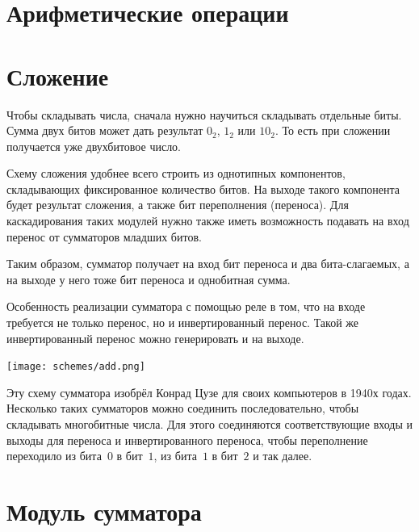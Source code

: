 \section{Арифметические операции}

\section{Сложение}

Чтобы складывать числа, сначала нужно научиться складывать отдельные биты.
Сумма двух битов может дать результат $0_2$, $1_2$ или $10_2$.
То есть при сложении получается уже двухбитовое число.

Схему сложения удобнее всего строить из однотипных компонентов, складывающих
фиксированное количество битов. На выходе такого компонента будет результат
сложения, а также бит переполнения (переноса). Для каскадирования
таких модулей нужно также иметь возможность подавать на вход перенос от
сумматоров младших битов.

Таким образом, сумматор получает на вход бит переноса и два бита-слагаемых, а на выходе
у него тоже бит переноса и однобитная сумма.

Особенность реализации сумматора с помощью реле в том, что на входе
требуется не только перенос, но и инвертированный перенос.
Такой же инвертированный перенос можно генерировать и на выходе.

\begin{center}
\texttt{[image: schemes/add.png]}
\end{center}

Эту схему сумматора изобрёл Конрад Цузе для своих компьютеров в 1940х годах.
Несколько таких сумматоров можно соединить последовательно, чтобы
складывать многобитные числа. Для этого соединяются соответствующие входы
и выходы для переноса и инвертированного переноса, чтобы
переполнение переходило из бита~$0$ в бит~$1$, из бита~$1$ в бит~$2$ и
так далее.

\section{Модуль сумматора}


